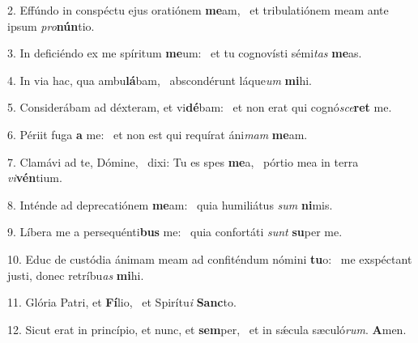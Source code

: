 2. Effúndo in conspéctu ejus oratiónem \textbf{me}am, \ast\  et tribulatiónem meam ante ipsum \textit{pro}\textbf{nún}tio.\

3. In deficiéndo ex me spíritum \textbf{me}um: \ast\  et tu cognovísti sémi\textit{tas} \textbf{me}as.\

4. In via hac, qua ambu\textbf{lá}bam, \ast\  abscondérunt láque\textit{um} \textbf{mi}hi.\

5. Considerábam ad déxteram, et vi\textbf{dé}bam: \ast\  et non erat qui cognó\textit{sce}\textbf{ret} me.\

6. Périit fuga \textbf{a} me: \ast\  et non est qui requírat áni\textit{mam} \textbf{me}am.\

7. Clamávi ad te, Dómine, \dag\  dixi: Tu es spes \textbf{me}a, \ast\  pórtio mea in terra \textit{vi}\textbf{vén}tium.\

8. Inténde ad deprecatiónem \textbf{me}am: \ast\  quia humiliátus \textit{sum} \textbf{ni}mis.\

9. Líbera me a persequénti\textbf{bus} me: \ast\  quia confortáti \textit{sunt} \textbf{su}per me.\

10. Educ de custódia ánimam meam ad confiténdum nómini \textbf{tu}o: \ast\  me exspéctant justi, donec retríbu\textit{as} \textbf{mi}hi.\

11. Glória Patri, et \textbf{Fí}lio, \ast\  et Spirítu\textit{i} \textbf{Sanc}to.\

12. Sicut erat in princípio, et nunc, et \textbf{sem}per, \ast\  et in sǽcula sæculó\textit{rum}. \textbf{A}men.\

